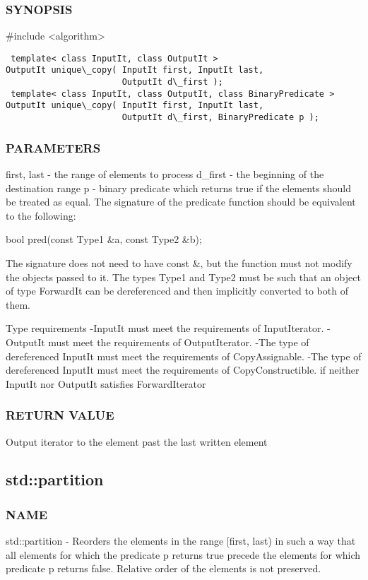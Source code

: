 \subsubsection{SYNOPSIS}
\#include <algorithm>

\begin{lstlisting}
 template< class InputIt, class OutputIt >
OutputIt unique\_copy( InputIt first, InputIt last,
                       OutputIt d\_first );
 template< class InputIt, class OutputIt, class BinaryPredicate >
OutputIt unique\_copy( InputIt first, InputIt last,
                       OutputIt d\_first, BinaryPredicate p );
\end{lstlisting}

\subsubsection{PARAMETERS}
first, last - the range of elements to process
d\_first - the beginning of the destination range
p - binary predicate which returns true  if the elements should be treated as equal.
The signature of the predicate function should be equivalent to the following:

 bool pred(const Type1 \&a, const Type2 \&b);

The signature does not need to have const \&, but the function must not modify the objects passed to it.
The types Type1 and Type2 must be such that an object of type ForwardIt can be dereferenced and then implicitly converted to both of them.


 Type requirements
 -InputIt must meet the requirements of InputIterator.
 -OutputIt must meet the requirements of OutputIterator.
 -The type of dereferenced InputIt must meet the requirements of CopyAssignable.
 -The type of dereferenced InputIt must meet the requirements of CopyConstructible. if neither InputIt nor OutputIt satisfies ForwardIterator

\subsubsection{RETURN VALUE}
Output iterator to the element past the last written element



\subsection{std::partition}

\subsubsection{NAME}
std::partition - Reorders the elements in the range [first, last) in such a way that all elements for which the predicate p returns true precede the elements for which predicate p returns false. Relative order of the elements is not preserved.

